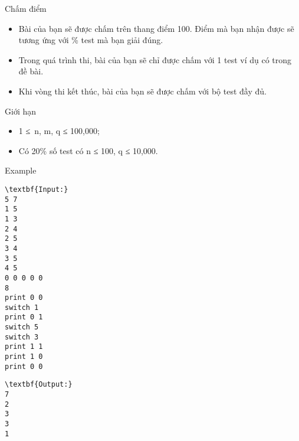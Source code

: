 Chấm điểm
\begin{itemize}
	\item Bài của bạn sẽ được chấm trên thang điểm 100. Điểm mà bạn nhận được sẽ tương ứng với \% test mà bạn giải đúng.
	\item Trong quá trình thi, bài của bạn sẽ chỉ được chấm với 1 test ví dụ có trong đề bài.
	\item Khi vòng thi kết thúc, bài của bạn sẽ được chấm với bộ test đầy đủ.
\end{itemize}
Giới hạn
\begin{itemize}
	\item 1 ≤ n, m, q ≤ 100,000;
	\item Có 20\% số test có n ≤ 100, q ≤ 10,000.
\end{itemize}
Example
\begin{verbatim}
\textbf{Input:}
5 7
1 5
1 3
2 4
2 5
3 4
3 5
4 5
0 0 0 0 0
8
print 0 0
switch 1
print 0 1
switch 5
switch 3
print 1 1
print 1 0
print 0 0
\end{verbatim}
\begin{verbatim}
\textbf{Output:}
7
2
3
3
1

\end{verbatim}